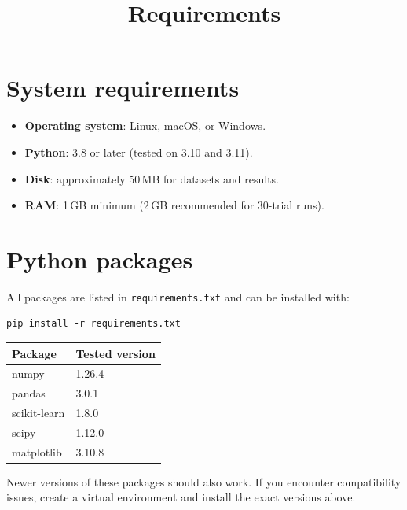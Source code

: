 \documentclass[10pt]{article}
\title{Requirements}
\author{}
\date{}
\begin{document}
\maketitle

\section*{System requirements}

\begin{itemize}
    \item \textbf{Operating system}: Linux, macOS, or Windows.
    \item \textbf{Python}: 3.8 or later (tested on 3.10 and 3.11).
    \item \textbf{Disk}: approximately 50\,MB for datasets and results.
    \item \textbf{RAM}: 1\,GB minimum (2\,GB recommended for 30-trial runs).
\end{itemize}

\section*{Python packages}

All packages are listed in \texttt{requirements.txt} and can be installed with:

\begin{verbatim}
pip install -r requirements.txt
\end{verbatim}

\begin{table}[h]
\centering
\begin{tabular}{ll}
\toprule
Package & Tested version \\
\midrule
numpy        & 1.26.4 \\
pandas       & 3.0.1  \\
scikit-learn & 1.8.0  \\
scipy        & 1.12.0 \\
matplotlib   & 3.10.8 \\
\bottomrule
\end{tabular}
\end{table}

\noindent Newer versions of these packages should also work.  If you encounter
compatibility issues, create a virtual environment and install the exact versions above.
\end{document}
